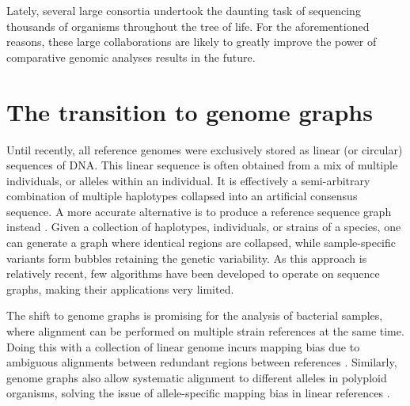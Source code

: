Lately, several large consortia \citep{genome10kcommunityofscientistsGenome10KProposal2009,poelchauI5kWorkspaceNAL2015,DarwinTreeLife} undertook the daunting task of sequencing thousands of organisms throughout the tree of life. For the aforementioned reasons, these large collaborations are likely to greatly improve the power of comparative genomic analyses results in the future.

\section{The transition to genome graphs}

Until recently, all reference genomes were exclusively stored as linear (or circular) sequences of DNA. This linear sequence is often obtained from a mix of multiple individuals, or alleles within an individual. It is effectively a semi-arbitrary combination of multiple haplotypes collapsed into an artificial consensus sequence. A more accurate alternative is to produce a reference sequence graph instead \cite{churchExtendingReferenceAssembly2015}. Given a collection of haplotypes, individuals, or strains of a species, one can generate a graph where identical regions are collapsed, while sample-specific variants form bubbles retaining the genetic variability. As this approach is relatively recent, few algorithms have been developed to operate on sequence graphs, making their applications very limited.

The shift to genome graphs is promising for the analysis of bacterial samples, where alignment can be performed on multiple strain references at the same time. Doing this with a collection of linear genome incurs mapping bias due to ambiguous alignments between redundant regions between references \cite{liDesignConstructionReference2020}. Similarly, genome graphs also allow systematic alignment to different alleles in polyploid organisms, solving the issue of allele-specific mapping bias in linear references \cite{vandegeijnWASPAllelespecificSoftware2015}. 